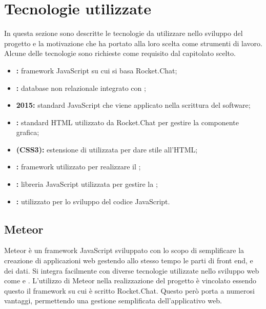 \section{Tecnologie utilizzate}
In questa sezione sono descritte le tecnologie da utilizzare nello sviluppo del progetto \ProjectName{} e la motivazione che ha portato alla loro scelta come strumenti di lavoro. Alcune delle tecnologie sono richieste come requisito dal capitolato scelto.
\begin{itemize}
	\item \textbf{:} framework JavaScript su cui si basa Rocket.Chat;
	\item \textbf{:} database non relazionale integrato con ;
	\item \textbf{ 2015:} standard JavaScript che viene applicato nella scrittura del software;
	\item \textbf{:} standard HTML utilizzato da Rocket.Chat per gestire la componente grafica;
	\item \textbf{ (CSS3):} estensione di  utilizzata per dare stile all'HTML; 
	\item \textbf{:} framework utilizzato per realizzare il ;
	\item \textbf{:} libreria JavaScript utilizzata per gestire la ;
	\item \textbf{:}  utilizzato per lo sviluppo del codice JavaScript.
\end{itemize}

\subsection{Meteor}
Meteor è un framework JavaScript sviluppato con lo scopo di semplificare la creazione di applicazioni web gestendo allo stesso tempo le parti di front end,  e dei dati. Si integra facilmente con diverse tecnologie utilizzate nello sviluppo web come  e .
L'utilizzo di Meteor nella realizzazione del progetto è vincolato essendo questo il framework su cui è scritto Rocket.Chat. Questo però porta a numerosi vantaggi, permettendo una gestione semplificata dell'applicativo web.

